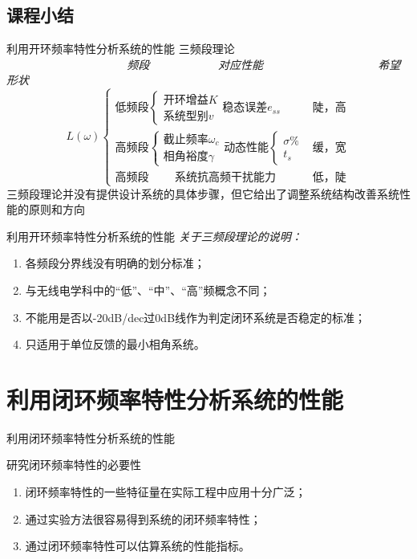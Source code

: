 \documentclass[handout,cjkutf8,table,aspectratio=1610]{beamer} %
\begin{document}
\subsection{课程小结}
\begin{frame}{利用开环频率特性分析系统的性能}
	三频段理论\\
	\emph{~~~~~~~~~~~~~~~~~~~~~频段~~~~~~~~~~~~对应性能~~~~~~~~~~~~~~~~~~~~希望形状}
	$$L(\omega)\begin{cases}
		\text{低频段}\begin{cases}\text{开环增益}K\\ \text{系统型别}v\end{cases}\text{稳态误差}e_{ss} & \text{陡，高}\\
		\text{高频段}\begin{cases}\text{截止频率}\omega_c\\\text{相角裕度}\gamma\end{cases}\text{动态性能}\begin{cases}\sigma\%\\ t_s\end{cases} & \text{缓，宽}\\
		\text{高频段~~~~~~~系统抗高频干扰能力} &\text{低，陡}
	\end{cases}$$
	三频段理论并没有提供设计系统的具体步骤，但它给出了调整系统结构改善系统性能的原则和方向
\end{frame}

\begin{frame}{利用开环频率特性分析系统的性能}
	\emph{关于三频段理论的说明：}
	\begin{enumerate}
		\item 各频段分界线没有明确的划分标准；
		\item 与无线电学科中的“低”、“中”、“高”频概念不同；
		\item 不能用是否以-20dB/dec过0dB线作为判定闭环系统是否稳定的标准；
		\item 只适用于单位反馈的最小相角系统。
	\end{enumerate}
\end{frame}

\section{利用闭环频率特性分析系统的性能}
\begin{frame}{利用闭环频率特性分析系统的性能}
	\begin{block}{研究闭环频率特性的必要性}
		\begin{enumerate}[(1)]
			\item 闭环频率特性的一些特征量在实际工程中应用十分广泛； 
			\item 通过实验方法很容易得到系统的闭环频率特性；
			\item 通过闭环频率特性可以估算系统的性能指标。
		\end{enumerate}
	\end{block}
\end{frame}
\end{document}
